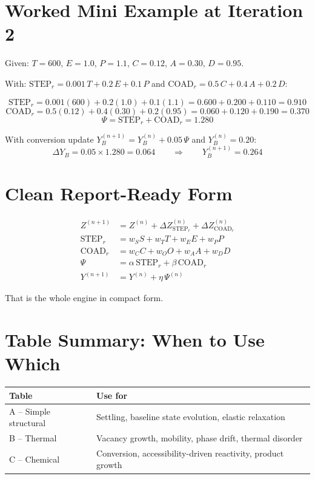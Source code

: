 \documentclass[11pt, letterpaper]{article}
\newcommand{\STEPr}{\mathrm{STEP}_r}
\newcommand{\COADr}{\mathrm{COAD}_r}
\begin{document}
\section{Worked Mini Example at Iteration 2}

Given:
$T = 600$, $E = 1.0$, $P = 1.1$, $C = 0.12$, $A = 0.30$, $D = 0.95$.

With:
$\STEPr = 0.001\,T + 0.2\,E + 0.1\,P$ and
$\COADr = 0.5\,C + 0.4\,A + 0.2\,D$:

\[
\STEPr = 0.001(600) + 0.2(1.0) + 0.1(1.1) = 0.600 + 0.200 + 0.110 = 0.910
\]
\[
\COADr = 0.5(0.12) + 0.4(0.30) + 0.2(0.95) = 0.060 + 0.120 + 0.190 = 0.370
\]
\[
\Psi = \STEPr + \COADr = 1.280
\]

With conversion update $Y_B^{(n+1)} = Y_B^{(n)} + 0.05\,\Psi$
and $Y_B^{(n)} = 0.20$:
\[
\Delta Y_B = 0.05 \times 1.280 = 0.064
\qquad\Longrightarrow\qquad
Y_B^{(n+1)} = 0.264
\]

\section{Clean Report-Ready Form}

\begin{align}
Z^{(n+1)} &= Z^{(n)} + \Delta Z_{\STEPr}^{(n)} + \Delta Z_{\COADr}^{(n)} \\[4pt]
\STEPr    &= w_S S + w_T T + w_E E + w_P P \\[4pt]
\COADr    &= w_C C + w_O O + w_A A + w_D D \\[4pt]
\Psi      &= \alpha\,\STEPr + \beta\,\COADr \\[4pt]
Y^{(n+1)} &= Y^{(n)} + \eta\,\Psi^{(n)}
\end{align}

That is the whole engine in compact form.

\section{Table Summary: When to Use Which}

\begin{tabular}{@{}ll@{}}
\toprule
Table & Use for \\
\midrule
A -- Simple structural & Settling, baseline state evolution, elastic relaxation \\
B -- Thermal           & Vacancy growth, mobility, phase drift, thermal disorder \\
C -- Chemical          & Conversion, accessibility-driven reactivity, product growth \\
\bottomrule
\end{tabular}
\end{document}
